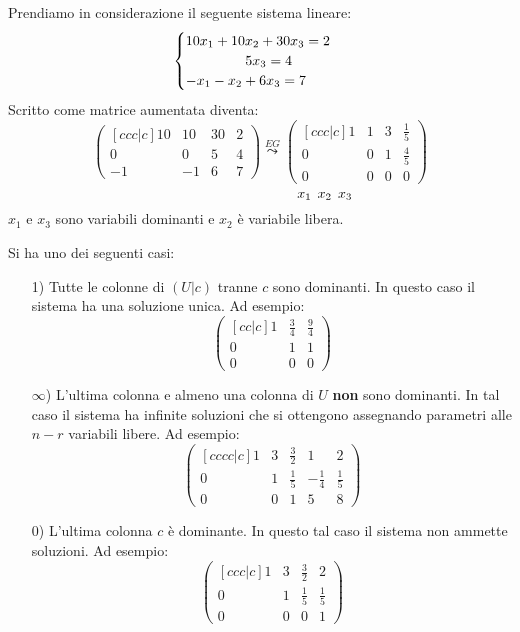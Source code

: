 \documentclass[a4paper]{article}
\theoremstyle{break}
\theoremstyle{break}
\theoremstyle{break}
\theoremstyle{break}
\begin{document}
\begin{example}
  Prendiamo in considerazione il seguente sistema lineare:
  \[
  \begin{cases}
    10x_1 + 10x_2 + 30x_3 = 2 \\
    \hspace{1.5cm} 5x_3 = 4 \\
    -x_1 - x_2 + 6x_3 = 7
  \end{cases}
  \] 
  Scritto come matrice aumentata diventa:
  \[
  \begin{pmatrix}[ccc|c]
    10 & 10 & 30 & 2 \\
    0 & 0 & 5 & 4 \\
    -1 & -1 & 6 & 7
  \end{pmatrix}
  \stackrel{EG}{\leadsto}
  \begin{pmatrix}[ccc|c]
    1 & 1 & 3 & \frac{1}{5} \\
    0 & 0 & 1 & \frac{4}{5} \\
    0 & 0 & 0 & 0
  \end{pmatrix}
  \]
  \[
    \hspace{3.3cm} x_1 \;\, x_2 \;\, x_3
  \] 
  \( x_1 \) e \( x_3 \) sono variabili dominanti e \( x_2 \) è variabile libera.
\end{example}

\noindent Si ha uno dei seguenti casi:
\begin{enumerate}
  \item[1)] Tutte le colonne di \( (U|c) \) tranne \( c \) sono dominanti. In questo caso il sistema
    ha una soluzione unica. Ad esempio:
        \label{D8}
        \[
          \begin{pmatrix}[cc|c]
            1 & \frac{3}{4} & \frac{9}{4} \\
            0 & 1           & 1           \\
            0 & 0           & 0
          \end{pmatrix} 
        \] 
      \item[\( \infty \))] L'ultima colonna e almeno una colonna di \( U \) \textbf{non} sono dominanti. In
    tal caso il sistema ha infinite soluzioni che si ottengono assegnando parametri alle
    \( n-r \) variabili libere. Ad esempio:
    \[
      \begin{pmatrix}[cccc|c]
        1 & 3 & \frac{3}{2} & 1 & 2\\
        0 & 1 & \frac{1}{5} & -\frac{1}{4} & \frac{1}{5} \\
        0 & 0 & 1 & 5 & 8
      \end{pmatrix} 
    \] 
  \item[0)] L'ultima colonna \( c \) è dominante. In questo tal caso il sistema non ammette
    soluzioni. Ad esempio:
    \[
      \begin{pmatrix}[ccc|c]
        1 & 3 & \frac{3}{2} & 2 \\
        0 & 1 & \frac{1}{5} & \frac{1}{5} \\
        0 & 0 & 0 & 1
      \end{pmatrix}
    \]
\end{enumerate}
\end{document}
